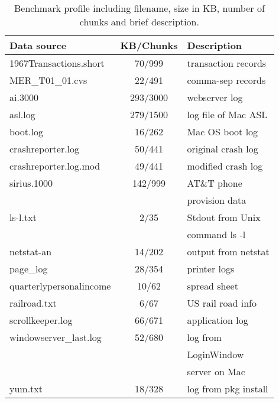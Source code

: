 \begin{table}
\begin{center}
\begin{tabular}{|l||c|l|} \hline
Data source		& KB/Chunks		& Description\\ \hline \hline
1967Transactions.short	& 70/999		& transaction records\\ \hline
MER\_T01\_01.cvs	& 22/491 	& comma-sep records\\ \hline
ai.3000			& 293/3000	& webserver log\\ \hline
asl.log 		& 279/1500	& log file of Mac ASL\\ \hline	
boot.log		& 16/262		& Mac OS boot log\\ \hline
crashreporter.log 	& 50/441 	& original crash log\\ \hline 
crashreporter.log.mod 	& 49/441	& modified crash log\\ \hline
sirius.1000		& 142/999 	& AT\&T phone\\
			&		& provision data\\ \hline
ls-l.txt		& 2/35		& Stdout from Unix\\
			&		& command ls -l\\ \hline
netstat-an		& 14/202		& output from netstat\\ \hline
page\_log		& 28/354		& printer logs\\ \hline
quarterlypersonalincome	& 10/62		& spread sheet\\ \hline 
railroad.txt		& 6/67		& US rail road info\\ \hline
scrollkeeper.log 	& 66/671		& application log\\ \hline
windowserver\_last.log 	& 52/680		& log from\\
                        &               & LoginWindow\\
                        &               & server on Mac\\ \hline
yum.txt			& 18/328		& log from pkg install\\ \hline
\end{tabular}
\caption{Benchmark profile including filename, size in KB, number of chunks
and brief description.} \shrink
\label{tab:benchmarks} 
\end{center}
\end{table}


